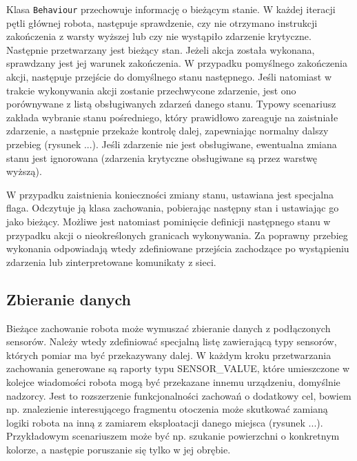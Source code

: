 Klasa {\tt Behaviour} przechowuje informację o bieżącym stanie. W każdej iteracji pętli głównej robota, następuje sprawdzenie, czy nie otrzymano instrukcji zakończenia z warsty wyższej lub czy nie wystąpiło zdarzenie krytyczne. Następnie przetwarzany jest bieżący stan. Jeżeli akcja została wykonana, sprawdzany jest jej warunek zakończenia. W przypadku pomyślnego zakończenia akcji, następuje przejście do domyślnego stanu następnego. Jeśli natomiast w trakcie wykonywania akcji zostanie przechwycone zdarzenie, jest ono porównywane z listą obsługiwanych zdarzeń danego stanu. Typowy scenariusz zakłada wybranie stanu pośredniego, który prawidłowo zareaguje na zaistniałe zdarzenie, a następnie przekaże kontrolę dalej, zapewniając normalny dalszy przebieg (rysunek ...). Jeśli zdarzenie nie jest obsługiwane, ewentualna zmiana stanu jest ignorowana (zdarzenia krytyczne obsługiwane są przez warstwę wyższą).


W przypadku zaistnienia konieczności zmiany stanu, ustawiana jest specjalna flaga. Odczytuje ją klasa zachowania, pobierając następny stan i ustawiając go jako bieżący. Możliwe jest natomiast pominięcie definicji następnego stanu w przypadku akcji o nieokreślonych granicach wykonywania. Za poprawny przebieg wykonania odpowiadają wtedy zdefiniowane przejścia zachodzące po wystąpieniu zdarzenia lub zinterpretowane komunikaty z sieci.



\subsection{Zbieranie danych}

Bieżące zachowanie robota może wymuszać zbieranie danych z podłączonych sensorów. Należy wtedy zdefiniować specjalną listę zawierającą typy sensorów, których pomiar ma być przekazywany dalej. W każdym kroku przetwarzania zachowania generowane są raporty typu SENSOR\_VALUE, które umieszczone w kolejce wiadomości robota mogą być przekazane innemu urządzeniu, domyślnie nadzorcy. Jest to rozszerzenie funkcjonalności zachowań o dodatkowy cel, bowiem np. znalezienie interesującego fragmentu otoczenia może skutkować zamianą logiki robota na inną z zamiarem eksploatacji danego miejsca (rysunek ...). Przykładowym scenariuszem może być np. szukanie powierzchni o konkretnym kolorze, a następie poruszanie się tylko w jej obrębie.


